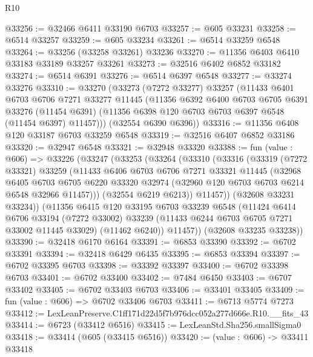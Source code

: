 \begin{lexlean}{R10}
\begin{coremodule}
@33256 := @32466 @6411 @33190 @6703
@33257 := @605 @33231
@33258 := @6514 @33257
@33259 := @605 @33234
@33261 := @6514 @33259 @6548
@33264 := @33256 (@33258 @33261) @33236
@33270 := @11356 @6403 @6410 @33183 @33189 @33257 @33261
@33273 := @32516 @6402 @6852 @33182
@33274 := @6514 @6391
@33276 := @6514 @6397 @6548
@33277 := @33274 @33276
@33310 := @33270
    (@33273
      (@7272 @33277)
      @33257
      (@11433
        @6401
        @6703
        @6706
        @7271
        @33277
        @11445
        (@11356
          @6392
          @6400
          @6703
          @6705
          @6391
          @33276
          (@11454 @6391)
          (@11356 @6398 @120 @6703 @6703 @6397 @6548 (@11454 @6397) @11457)))
      (@32554 @6390 @6396))
@33316 := @11356 @6408 @120 @33187 @6703 @33259 @6548
@33319 := @32516 @6407 @6852 @33186
@33320 := @32947 @6548
@33321 := @32948 @33320
@33388 := fun (value : @606) =>
  @33226
    (@33247
      (@33253
        (@33264
          (@33310
            (@33316
              (@33319
                (@7272 @33321)
                @33259
                (@11433
                  @6406
                  @6703
                  @6706
                  @7271
                  @33321
                  @11445
                  (@32968
                    @6405
                    @6703
                    @6705
                    @6220
                    @33320
                    @32974
                    (@32960 @120 @6703 @6703 @6214 @6548 @32966 @11457)))
                (@32554 @6219 @6213))
              @11457))
          (@32608 @33231 @33234))
        (@11356
          @6415
          @120
          @33195
          @6703
          @33239
          @6548
          (@11424
            @6414
            @6706
            @33194
            (@7272 @33002)
            @33239
            (@11433 @6244 @6703 @6705 @7271 @33002 @11445 @33029)
            (@11462 @6240))
          @11457))
      (@32608 @33235 @33238))
@33390 := @32418 @6170 @6164
@33391 := @6853 @33390
@33392 := @6702 @33391
@33394 := @32418 @6429 @6435
@33395 := @6853 @33394
@33397 := @6702 @33395 @6703
@33398 := @33392 @33397
@33400 := @6702 @33398 @6703
@33401 := @6702 @33400
@33402 := @7484 @6450
@33403 := @6707 @33402
@33405 := @6702 @33403 @6703
@33406 := @33401 @33405
@33409 := fun (value : @606) => @6702 @33406 @6703
@33411 := @6713 @5774 @7273
@33412 := LexLeanPreserve.C1ff171d22d5f7b976dcc052a277d666e.R10.__fits_43
@33414 := @6723 (@33412 @6516)
@33415 := LexLeanStd.Sha256.smallSigma0
@33418 := @33414 (@605 (@33415 @6516))
@33420 := (value : @606) -> @33411 @33418

\end{coremodule}
\end{lexlean}

